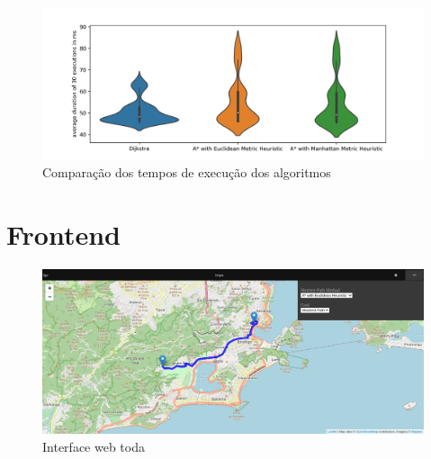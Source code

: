 \documentclass{article}
\begin{document}
\begin{figure}[H]
    \centering
    \includegraphics[scale=0.72]{EDA_benchmark_violinplot.png}
    \caption{Comparação dos tempos de execução dos algoritmos}
    \label{fig:my_label}
\end{figure}

\section{Frontend}

\begin{figure}[H]
    \centering
    \includegraphics[scale=0.5]{EDA_full_inteface_web.png}
    \caption{Interface web toda}
    \label{fig:my_label}
\end{figure}
\end{document}
